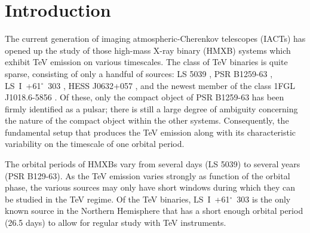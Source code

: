 \documentclass[preprint2]{aastex}
\newcommand{\lsi}{LS~I~+61$^{\circ}$~303}
\begin{document}
\keywords{}

\section{Introduction}

The current generation of imaging atmospheric-Cherenkov telescopes (IACTs) has opened up the study of those high-mass X-ray binary (HMXB) systems which exhibit TeV emission on various timescales. The class of TeV binaries is quite sparse, consisting of only a handful of sources: LS 5039 \citep{2005Sci...309..746A}, PSR B1259-63 \citep{2005A&A...442....1A}, \lsi{} \citep{Albert2006}, HESS J0632+057 \citep{2009ApJ...698L..94A}, and the newest member of the class 1FGL J1018.6-5856 \citep{2015arXiv150302711H}. Of these, only the compact object of PSR B1259-63 has been firmly identified as a pulsar; there is still a large degree of ambiguity concerning the nature of the compact object within the other systems. Consequently, the fundamental setup that produces the TeV emission along with its characteristic variability on the timescale of one orbital period.



The orbital periods of HMXBs vary from several days (LS 5039) to several years (PSR B129-63). As the TeV emission varies strongly as function of the orbital phase, the various sources may only have short windows during which they can be studied in the TeV regime. Of the TeV binaries, \lsi{} is the only known source in the Northern Hemisphere that has a short enough orbital period (26.5 days) to allow for regular study with TeV instruments. 
\end{document}
